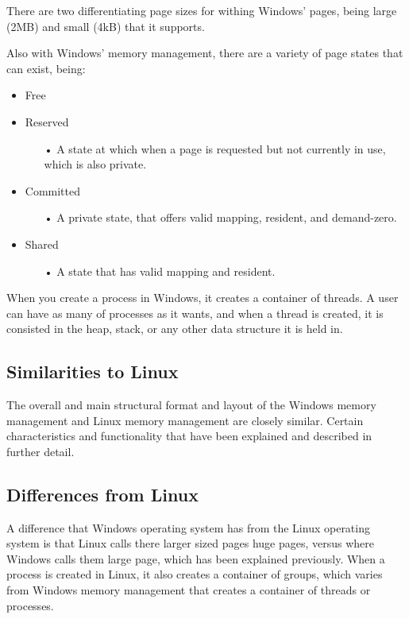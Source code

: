 \documentclass[letterpaper,10pt,onecolumn]{IEEEtran}
\begin{document}
\par
There are two differentiating page sizes for withing Windows' pages, being large (2MB) and small (4kB) that it supports.

\par
Also with Windows' memory management, there are a variety of page states that can exist, being:
\begin{itemize}
	\item Free
	\item Reserved
		\begin{itemize}
			\item[•] A state at which when a page is requested but not currently in use, which is also private.
		\end{itemize}
	\item Committed
		\begin{itemize}
			\item[•] A private state, that offers valid mapping, resident, and demand-zero.
		\end{itemize}
	\item Shared
		\begin{itemize}
			\item[•] A state that has valid mapping and resident.
		\end{itemize}
\end{itemize}

\par
When you create a process in Windows, it creates a container of threads. A user can have as many of processes as it wants, and when a thread is created, it is consisted in the heap, stack, or any other data structure it is held in.

	\subsection*{Similarities to Linux}
	\par
	The overall and main structural format and layout of the Windows memory management and Linux memory management are closely similar. Certain characteristics and functionality that have been explained and described in further detail.

	\subsection*{Differences from Linux}
	\par
	 A difference that Windows operating system has from the Linux operating system is that Linux calls there larger sized pages huge pages, versus where Windows calls them large page, which has been explained previously. When a process is created in Linux, it also creates a container of groups, which varies from Windows memory management that creates a container of threads or processes.
\end{document}
